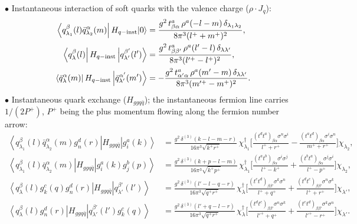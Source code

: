 \documentclass[11pt,a4paper]{article}
\numberwithin{equation}{section}
\newcommand{\dg}{\dagger}
\newcommand{\dthree}{\delta^{(3)}}
\newcommand{\ket}[1]{\left|#1\right\rangle}
\newcommand{\bra}[1]{\left\langle#1\right|}
\newcommand{\vac}{|0\rangle}
\newcommand{\qk}[3]{q^{#1}_{#2}(#3)}
\newcommand{\aqk}[3]{\bar q^{#1}_{#2}(#3)}
\newcommand{\gl}[3]{g^{#1}_{#2}(#3)}
\begin{document}
\noindent$\bullet$ Instantaneous interaction of soft quarks with the valence charge ($\rho\cdot J_{q}$):
{\small\begin{align}
\bra{\qk{\beta}{\lambda_{1}}{l}\aqk{\alpha}{\lambda_{2}}{m}}H_{q-{\rm inst}}\vac&=
\frac{g^{2}\,t^{a}_{\beta\alpha}\,\rho^{a}(-l-m)\,\delta_{\lambda_{1}\lambda_{2}}}{8\pi^{3}(l^{+}+m^{+})^{2}},
\label{eq:MEinst}\\
\bra{\qk{\beta}{\lambda}{l}}H_{q-{\rm inst}}\ket{\qk{\beta'}{\lambda'}{l'}}&=
\frac{g^{2}\,t^{a}_{\beta\beta'}\,\rho^{a}(l'-l)\,\delta_{\lambda\lambda'}}{8\pi^{3}(l'^{+}-l^{+})^{2}},
\label{eq:MEinstq}\\
\bra{\aqk{\alpha}{\lambda}{m}}H_{q-{\rm inst}}\ket{\aqk{\alpha'}{\lambda'}{m'}}&=
-\frac{g^{2}\,t^{a}_{\alpha'\alpha}\,\rho^{a}(m'-m)\,\delta_{\lambda\lambda'}}{8\pi^{3}(m'^{+}-m^{+})^{2}}.
\label{eq:MEinstqb}
\end{align}}
$\bullet$ Instantaneous quark exchange ($H_{ggq\bar q}$); the instantaneous fermion line carries
$1/(2P^{+})$, $P^{+}$ being the plus momentum flowing along the fermion number arrow:
{\small\begin{align}
\bra{\qk{\beta}{\lambda_{1}}{l}\aqk{\alpha}{\lambda_{2}}{m}\gl{d}{n}{r}}H_{ggq\bar q}\ket{\gl{a}{i}{k}}&=
\frac{g^{2}\,\dthree(k-l-m-r)}{16\pi^{3}\sqrt{k^{+}r^{+}}}\,
\chi^{\dg}_{\lambda_{1}}\!\Big[\frac{(t^{d}t^{a})_{\beta\alpha}\sigma^{n}\sigma^{i}}{l^{+}+r^{+}}
-\frac{(t^{a}t^{d})_{\beta\alpha}\sigma^{i}\sigma^{n}}{m^{+}+r^{+}}\Big]\chi_{\lambda_{2}},
\label{eq:MEggqq1}\\
\bra{\qk{\beta}{\lambda_{1}}{l}\aqk{\alpha}{\lambda_{2}}{m}}H_{ggq\bar q}\ket{\gl{a}{i}{k}\gl{b}{j}{p}}&=
\frac{g^{2}\,\dthree(k+p-l-m)}{16\pi^{3}\sqrt{k^{+}p^{+}}}\,
\chi^{\dg}_{\lambda_{1}}\!\Big[\frac{(t^{a}t^{b})_{\beta\alpha}\sigma^{i}\sigma^{j}}{l^{+}-k^{+}}
+\frac{(t^{b}t^{a})_{\beta\alpha}\sigma^{j}\sigma^{i}}{l^{+}-p^{+}}\Big]\chi_{\lambda_{2}},
\label{eq:MEggqq2}\\
\bra{\qk{\beta}{\lambda}{l}\gl{c}{k}{q}\gl{d}{n}{r}}H_{ggq\bar q}\ket{\qk{\beta'}{\lambda'}{l'}}&=
\frac{g^{2}\,\dthree(l'-l-q-r)}{16\pi^{3}\sqrt{q^{+}r^{+}}}\,
\chi^{\dg}_{\lambda}\!\Big[\frac{(t^{c}t^{d})_{\beta\beta'}\sigma^{k}\sigma^{n}}{l^{+}+q^{+}}
+\frac{(t^{d}t^{c})_{\beta\beta'}\sigma^{n}\sigma^{k}}{l^{+}+r^{+}}\Big]\chi_{\lambda'},
\label{eq:MEq2g}\\
\bra{\qk{\beta}{\lambda}{l}\gl{d}{n}{r}}H_{ggq\bar q}\ket{\qk{\beta'}{\lambda'}{l'}\gl{c}{k}{q}}&=
\frac{g^{2}\,\dthree(l'+q-l-r)}{16\pi^{3}\sqrt{q^{+}r^{+}}}\,
\chi^{\dg}_{\lambda}\!\Big[\frac{(t^{d}t^{c})_{\beta\beta'}\sigma^{n}\sigma^{k}}{l'^{+}+q^{+}}
+\frac{(t^{c}t^{d})_{\beta\beta'}\sigma^{k}\sigma^{n}}{l'^{+}-r^{+}}\Big]\chi_{\lambda'}.
\label{eq:MEqginst}
\end{align}}
\end{document}
